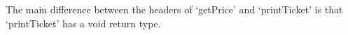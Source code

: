 The main difference between the headers of `getPrice' and `printTicket'
is that `printTicket' has a void return type.
